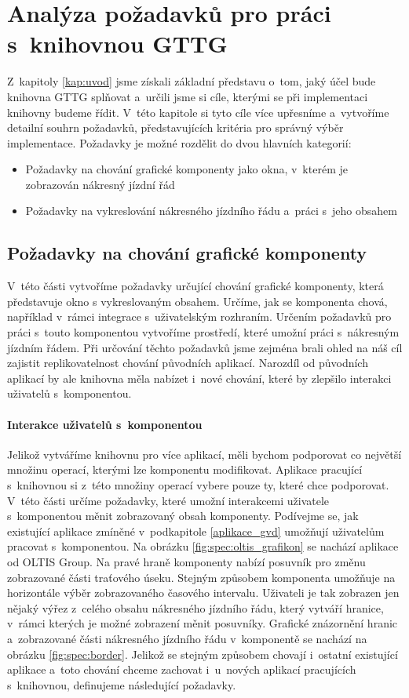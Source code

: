 \chapter{Analýza požadavků pro práci s~knihovnou GTTG}
\label{kap:spec}
Z~kapitoly \ref{kap:uvod} jsme získali základní představu o~tom, jaký účel bude knihovna GTTG splňovat a~určili jsme si cíle, kterými se při implementaci knihovny budeme řídit. V~této kapitole si tyto cíle více upřesníme a~vytvoříme detailní souhrn požadavků, představujících kritéria pro správný výběr implementace. Požadavky je možné rozdělit do dvou hlavních kategorií:

\begin{itemize}
	\item Požadavky na chování grafické komponenty jako okna, v~kterém je zobrazován nákresný jízdní řád 
	\item Požadavky na vykreslování nákresného jízdního řádu a~práci s~jeho obsahem
\end{itemize}

\section{Požadavky na chování grafické komponenty}
\label{kap:spec:komponenta}
V~této části vytvoříme požadavky určující chování grafické komponenty, která představuje okno s vykreslovaným obsahem. Určíme, jak se komponenta chová, například v~rámci integrace s~uživatelským rozhraním. Určením požadavků pro práci s~touto komponentou vytvoříme prostředí, které umožní práci s~nákresným jízdním řádem. Při určování těchto požadavků jsme zejména brali ohled na náš cíl zajistit replikovatelnost chování původních aplikací. Narozdíl od původních aplikací by ale knihovna měla nabízet i~nové chování, které by zlepšilo interakci uživatelů s~komponentou.

\subsubsection*{Interakce uživatelů s~komponentou}
Jelikož vytváříme knihovnu pro více aplikací, měli bychom podporovat co největší množinu operací, kterými lze komponentu modifikovat. Aplikace pracující s~knihovnou si z~této množiny operací vybere pouze ty, které chce podporovat. V~této části určíme požadavky, které umožní interakcemi uživatele s~komponentou měnit zobrazovaný obsah komponenty. Podívejme se, jak existující aplikace zmíněné v~podkapitole \ref{aplikace_gvd} umožňují uživatelům pracovat s~komponentou. Na obrázku \ref{fig:spec:oltis_grafikon} se nachází aplikace od OLTIS Group. Na pravé hraně komponenty nabízí posuvník pro změnu zobrazované části traťového úseku. Stejným způsobem komponenta umožňuje na horizontále výběr zobrazovaného časového intervalu. Uživateli je tak zobrazen jen nějaký výřez z~celého obsahu nákresného jízdního řádu, který vytváří hranice, v~rámci kterých je možné zobrazení měnit posuvníky. Grafické znázornění hranic a~zobrazované části nákresného jízdního řádu v~komponentě se nachází na obrázku \ref{fig:spec:border}. Jelikož se stejným způsobem chovají i~ostatní existující aplikace a~toto chování chceme zachovat i~u~nových aplikací pracujících s~knihovnou, definujeme následující požadavky.

